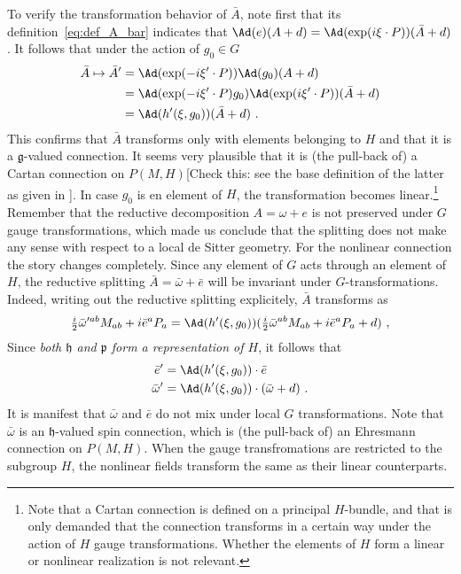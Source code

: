 \documentclass[11pt]{article}
\begin{document}
To verify the transformation behavior of $\bar{A}$, note first 
that its definition~\eqref{eq:def_A_bar} indicates that 
$\Ad(e)(A+d) = \Ad(\exp(i\xi\cdot P))(\bar{A}+d)$. It follows 
that under the action of $g_0 \in G$
%
\begin{displaymath}
\begin{split}
	\bar{A} \mapsto \bar{A}'
		&= \Ad(\exp(-i\xi'\cdot P))\Ad(g_0)(A+d) \\
		&= \Ad(\exp(-i\xi'\cdot P) g_0) \Ad(\exp(i\xi'\cdot P)) 
		(\bar{A}+d) \\
		&= \Ad(h'(\xi,g_0))(\bar{A}+d)~.
\end{split}
\end{displaymath}
This confirms that $\bar{A}$ transforms only with elements 
belonging to $H$ and that it is a $\mathfrak{g}$-valued 
connection. It seems very plausible that it is (the pull-back of) 
a Cartan connection on $P(M,H)$[{\blu Check this: see the base 
	definition of the latter as given in	
	\cite{sharpe1997diff_geo}}]. In case $g_0$ is en element of 
$H$, the transformation becomes linear.\footnote{Note that a 
	Cartan connection is defined on a principal $H$-bundle, and 
	that is only demanded that the connection transforms in a 
	certain way under the action of $H$ gauge transformations.  
	Whether the elements of $H$ form a linear or nonlinear 
	realization is not relevant.}  Remember that the reductive 
decomposition $A = \omega + e$ is not preserved under $G$ gauge 
transformations, which made us conclude that the splitting does 
not make any sense with respect to a local de Sitter geometry.  
For the nonlinear connection the story changes completely. Since 
any element of $G$ acts through an element of $H$, the reductive 
splitting $\bar{A} = \bar{\omega} + \bar{e}$ will be invariant 
under $G$-transformations. Indeed, writing out the reductive 
splitting explicitely, $\bar{A}$ transforms as
%
\begin{displaymath}
	\tfrac{i}{2} \bar{\omega}'^{ab} M_{ab} + i\bar{e}^a P_a = 
	\Ad(h'(\xi,g_0))(	\tfrac{i}{2} \bar{\omega}^{ab} M_{ab} + 
	i\bar{e}^a P_a + d)~,
\end{displaymath}
Since \emph{both $\mathfrak{h}$ and $\mathfrak{p}$ form a 
	representation of $H$}, it follows that
%
\begin{subequations}
\begin{align}
	\label{eq:trafo_ebar}
	\bar{e}' &= \Ad(h'(\xi,g_0)) \cdot \bar{e} \\
	\bar{\omega}' &= \Ad(h'(\xi,g_0)) \cdot (\bar{\omega}+d)~.
\end{align}
\end{subequations}
It is manifest that $\bar{\omega}$ and $\bar{e}$ do not mix under 
local $G$ transformations. Note that $\bar{\omega}$ is an 
$\mathfrak{h}$-valued spin connection, which is (the pull-back 
of) an Ehresmann connection on $P(M,H)$. When the gauge 
transfromations are restricted to the subgroup $H$, the nonlinear 
fields transform the same as their linear counterparts. 
\end{document}
